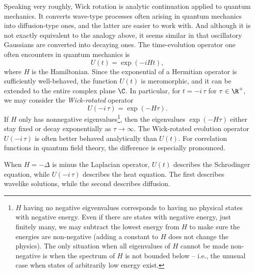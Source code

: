 Speaking very roughly, Wick rotation is analytic continuation applied to quantum mechanics. It converts wave-type processes often arising in quantum mechanics into diffusion-type ones, and the latter are easier to work with. And although it is not exactly equivalent to the analogy above, it seems similar in that oscillatory Gaussians are converted into decaying ones. The time-evolution operator one often encounters in quantum mechanics is
\begin{equation*}
    U(t) = \exp(-i H t),
\end{equation*}
where $H$ is the Hamiltonian. Since the exponential of a Hermitian operator is sufficiently well-behaved, the function $U(t)$ is meromorphic, and it can be extended to the entire complex plane $\C$. In particular, for $t = -i \, \tau$ for $\tau \in \R^+$, we may consider the \emph{Wick-rotated} operator
\begin{equation*}
    U(-i \, \tau) = \exp(- H \tau).
\end{equation*}
If $H$ only has nonnegative eigenvalues\footnote{$H$ having no negative eigvenvalues corresponds to having no physical states with negative energy. Even if there are states with negative energy, just finitely many, we may subtract the lowest energy from $H$ to make sure the energies are non-negative (adding a constant to $H$ does not change the physics). The only situation when all eigenvalues of $H$ cannot be made non-negative is when the spectrum of $H$ is not bounded below -- i.e., the unusual case when states of arbitrarily low energy exist.}, then the eigenvalues $\exp(-H \tau)$ either stay fixed or decay exponentially as $\tau \to \infty$. The Wick-rotated evolution operator $U(-i \, \tau)$ is often better behaved analytically than $U(t)$. For correlation functions in quantum field theory, the difference is especially pronounced.
\begin{example}
When $H = -\Delta$ is minus the Laplacian operator, $U(t)$ describes the Schrodinger equation, while $U(-i \, \tau)$ describes the heat equation. The first describes wavelike solutions, while the second describes diffusion.
\end{example}